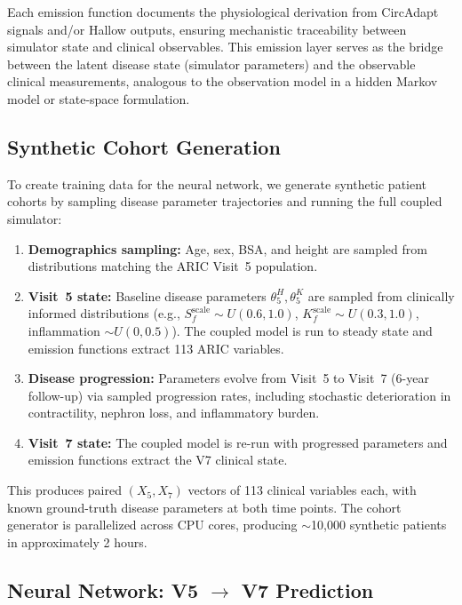 \documentclass[pmlr]{jmlr}
\begin{document}
Each emission function documents the physiological derivation from CircAdapt signals and/or Hallow outputs, ensuring mechanistic traceability between simulator state and clinical observables. This emission layer serves as the bridge between the latent disease state (simulator parameters) and the observable clinical measurements, analogous to the observation model in a hidden Markov model or state-space formulation.

\subsection{Synthetic Cohort Generation}
\label{sec:cohort}

To create training data for the neural network, we generate synthetic patient cohorts by sampling disease parameter trajectories and running the full coupled simulator:

\begin{enumerate}
\item \textbf{Demographics sampling:} Age, sex, BSA, and height are sampled from distributions matching the ARIC Visit~5 population.

\item \textbf{Visit~5 state:} Baseline disease parameters $\theta_5^H, \theta_5^K$ are sampled from clinically informed distributions (e.g., $S_f^{\text{scale}} \sim U(0.6, 1.0)$, $K_f^{\text{scale}} \sim U(0.3, 1.0)$, inflammation $\sim U(0, 0.5)$). The coupled model is run to steady state and emission functions extract 113 ARIC variables.

\item \textbf{Disease progression:} Parameters evolve from Visit~5 to Visit~7 (6-year follow-up) via sampled progression rates, including stochastic deterioration in contractility, nephron loss, and inflammatory burden.

\item \textbf{Visit~7 state:} The coupled model is re-run with progressed parameters and emission functions extract the V7 clinical state.
\end{enumerate}

This produces paired $(X_5, X_7)$ vectors of 113 clinical variables each, with known ground-truth disease parameters at both time points. The cohort generator is parallelized across CPU cores, producing $\sim$10,000 synthetic patients in approximately 2 hours.

\subsection{Neural Network: V5 $\to$ V7 Prediction}
\label{sec:nn}
\end{document}
